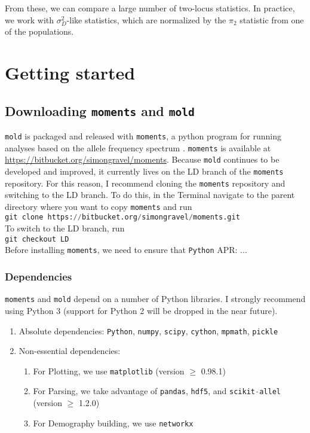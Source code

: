 \documentclass[10pt]{article}
\makeatletter
\renewcommand{\cite}{\citep}
\newcommand{\comment}[1]{{\color{blue}APR: #1}}
\newcommand{\mold}{\texttt{mold}\xspace}
\newcommand{\py}[1]{\lstinline[breaklines=true,language=Python, showstringspaces=False]@#1@}
\makeatother
\begin{document}
From these, we can compare a large number of two-locus statistics.
In practice, we work with $\sigma_D^2$-like statistics, which are normalized by the $\pi_2$ statistic from one of the populations.


\section{Getting started}

\subsection{Downloading \py{moments} and \mold}

\mold is packaged and released with \py{moments}, a python program for running analyses based on the allele frequency spectrum \cite{Jouganous2017}.
\py{moments} is available at \url{https://bitbucket.org/simongravel/moments}.
Because \mold continues to be developed and improved, it currently lives on the LD branch of the \py{moments} repository.
For this reason, I recommend cloning the \py{moments} repository and switching to the LD branch.
To do this, in the Terminal navigate to the parent directory where you want to copy \py{moments} and run\\
\py{git clone https://bitbucket.org/simongravel/moments.git}\\
To switch to the LD branch, run \\
\py{git checkout LD}\\
Before installing \py{moments}, we need to ensure that  \py{Python} \comment{...}

\subsubsection{Dependencies}

\py{moments} and \mold depend on a number of Python libraries. I strongly recommend using Python 3 (support for Python 2 will be dropped in the near future).

\begin{enumerate}
\item Absolute dependencies: \py{Python}, \py{numpy}, \py{scipy}, \py{cython}, \py{mpmath}, \py{pickle}
\item Non-essential dependencies:
\begin{enumerate}
\item For Plotting, we use \py{matplotlib} (version $\geq$ 0.98.1)
\item For Parsing, we take advantage of \py{pandas}, \py{hdf5}, and \py{scikit-allel} (version $\geq$ 1.2.0) \cite{}
\item For Demography building, we use \py{networkx}
\end{enumerate}
\end{enumerate}
\end{document}
